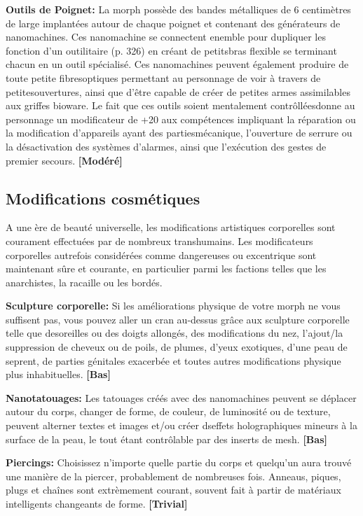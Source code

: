 {{\textbf{Outils de Poignet:} La morph possède des bandes métalliques de 6 centimètres de large implantées autour de chaque poignet et contenant des générateurs de nanomachines.  Ces nanomachine se connectent enemble pour dupliquer les fonction d'un outilitaire (p. 326) en créant de petitsbras flexible se terminant chacun en un outil spécialisé. Ces nanomachines peuvent également produire de toute petite fibresoptiques permettant au personnage de voir à travers de petitesouvertures, ainsi que d'être capable de créer de petites armes assimilables aux griffes bioware. Le fait que ces outils soient mentalement contrôlléesdonne au personnage un modificateur de +20 aux compétences impliquant la réparation ou la modification d'appareils ayant des partiesmécanique, l'ouverture de serrure ou la désactivation des systèmes d'alarmes, ainsi que l'exécution des gestes de premier secours. \textbf{[Modéré]} 



\subsection{Modifications cosmétiques} \label{sec:cosmetic-mods} 

A une ère de beauté universelle, les modifications artistiques corporelles sont courament effectuées par de nombreux transhumains. Les modificateurs corporelles autrefois considérées comme dangereuses ou excentrique sont maintenant sûre et courante, en particulier parmi les factions telles que les anarchistes, la racaille ou les bordés. 

\textbf{Sculpture corporelle:} Si les améliorations physique de votre morph ne vous suffisent pas, vous pouvez aller un cran au-dessus grâce aux sculpture corporelle telle que desoreilles ou des doigts allongés, des modifications du nez, l'ajout/la suppression de cheveux ou de poils, de plumes, d'yeux exotiques, d'une peau de seprent, de parties génitales exacerbée et toutes autres modifications physique plus inhabituelles. \textbf{[Bas]} 

\textbf{Nanotatouages:} Les tatouages créés avec des nanomachines peuvent se déplacer autour du corps, changer de forme, de couleur, de luminosité ou de texture, peuvent alterner textes et images et/ou créer dseffets holographiques mineurs à la surface de la peau, le tout étant contrôlable par des inserts de mesh. \textbf{[Bas]} 

\textbf{Piercings:} Choisissez n'importe quelle partie du corps et quelqu'un aura trouvé une manière de la piercer, probablement de nombreuses fois. Anneaus, piques, plugs et chaînes sont extrèmement courant, souvent fait à partir de matériaux intelligents changeants de forme. \textbf{[Trivial]} 

}}

